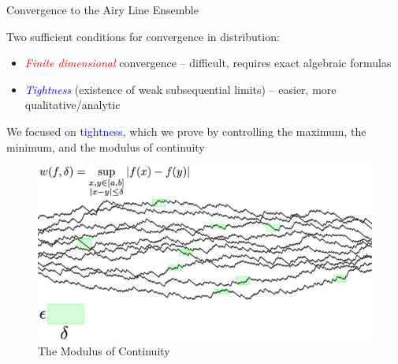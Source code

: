 \documentclass[9pt,t,dvipsnames]{beamer}
\begin{document}
\begin{frame}{Convergence to the Airy Line Ensemble}
	
	Two sufficient conditions for convergence in distribution:
	\begin{itemize}
		
			\item \textcolor{red}{\textit{Finite dimensional}} convergence -- difficult, requires exact algebraic formulas
			
			\item \textcolor{blue}{\textit{Tightness}} (existence of weak subsequential limits) -- easier, more qualitative/analytic
	\end{itemize}

	We focused on \textcolor{blue}{tightness}, which we prove by controlling the maximum, the minimum, and the modulus of continuity
\begin{figure}
	\includegraphics[height=0.45\textheight]{graphics/ModulusCont.jpg}
	\caption{The Modulus of Continuity}
\end{figure}

\end{frame}
\end{document}
